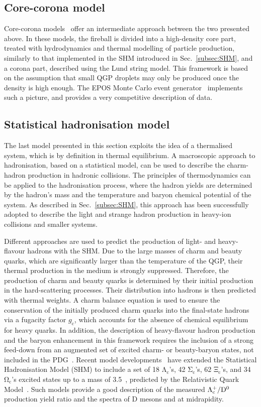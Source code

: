 \subsection{Core-corona model}
Core-corona models~\cite{Werner:2007bf} offer an intermediate approach between the two presented above. In these models, the fireball is divided into a high-density core part, treated with hydrodynamics and thermal modelling of particle production, similarly to that implemented in the SHM introduced in Sec.~\ref{subsec:SHM}, and a corona part, described using the Lund string model. This framework is based on the assumption that small QGP droplets may only be produced once the density is high enough. The EPOS Monte Carlo event generator~\cite{Porteboeuf:2008fgf} implements such a picture, and provides a very competitive description of data.

\subsection{Statistical hadronisation model}
The last model presented in this section exploits the idea of a thermalised system, which is by definition in thermal equilibrium. A macroscopic approach to hadronisation, based on a statistical model, can be used to describe the charm-hadron production in hadronic collisions. The principles of thermodynamics can be applied to the hadronisation process, where the hadron yields are determined by the hadron's mass and the temperature and baryon chemical potential of the system. As described in Sec.~\ref{subsec:SHM}, this approach has been successfully adopted to describe the light and strange hadron production in heavy-ion collisions and smaller systems. 

Different approaches are used to predict the production of light- and heavy-flavour hadrons with the SHM. Due to the large masses of charm and beauty quarks, which are significantly larger than the temperature of the QGP, their thermal production in the medium is strongly suppressed. Therefore, the production of charm and beauty quarks is determined by their initial production in the hard-scattering processes. Their distribution into hadrons is then predicted with thermal weights. A charm balance equation is used to ensure the conservation of the initially produced charm quarks into the final-state hadrons via a fugacity factor $g_\mathrm{c}$, which accounts for the absence of chemical equilibrium for heavy quarks. In addition, the description of heavy-flavour hadron production and the baryon enhancement in this framework requires the inclusion of a strong feed-down from an augmented set of excited charm- or beauty-baryon states, not included in the PDG~\cite{pdg}. Recent model developments~\cite{He:2019tik,He:2022tod} have extended the Statistical Hadronisation Model (SHM) to include a set of 18 $\mathrm{\Lambda_c}$'s, 42 $\mathrm{\Sigma_c}$'s, 62 $\mathrm{\Xi_c}$'s, and 34 $\mathrm{\Omega_c}$'s excited states up to a mass of 3.5~\gev, predicted by the Relativistic Quark Model~\cite{Ebert:2011kk}. Such models provide a good description of the measured $\mathrm{\mathrm{\Lambda_c^+}/D^0}$ production yield ratio and the \pt spectra of D mesons and \lc at midrapidity.

